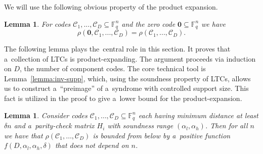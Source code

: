 \documentclass[conference]{IEEEtran}
\theoremstyle{plain}
\newtheorem{lemma}[theorem]{Lemma}
\theoremstyle{definition}
\theoremstyle{remark}
\newcommand{\cC}{\mathcal{C}}
\newcommand{\F}{\mathbb{F}}
\begin{document}
We will use the following obvious property of the product expansion.

\begin{lemma}\label{lemma:add-zero-code}
    For codes $\cC_1,...,\cC_D\subseteq \F_q^n$ and the zero code $\mathbf{0}\subseteq \F_q^n$ we have \[
    \rho(\mathbf{0},\cC_1,...,\cC_D)= \rho(\cC_1,...,\cC_D).
    \]
\end{lemma}

The following lemma plays the~central role in this section. It proves that a~collection of LTCs is product-expanding. The argument proceeds via induction on $D$, the number of component codes. The core technical tool is Lemma~\ref{lemma:inv-supp}, which, using the soundness property of LTCs, allows us to construct a~``preimage'' of a~syndrome with controlled support size. This fact is utilized in the proof to give a~lower bound for the product-expansion.

\begin{lemma}\label{lemma:prod-ltc}
Consider codes $\cC_1,\dots,\cC_D\subseteq \F_q^n$ each having minimum distance at least $\delta n$ and a~parity-check matrix $H_i$ with soundness range $(\alpha_l,\alpha_h)$. Then for all $n$ we have that $\rho(\cC_1,\dots,\cC_D)$ is bounded from below by a~positive function $f(D, \alpha_l, \alpha_h, \delta)$ that does not depend on $n$.
\end{lemma}
\end{document}

